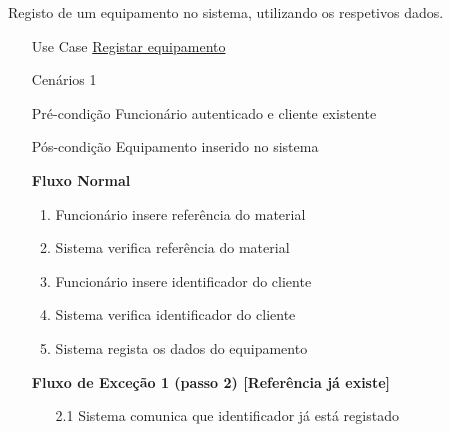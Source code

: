\documentclass[../relatorio.tex]{subfiles}
\begin{document}
Registo de um equipamento no sistema, utilizando os respetivos dados.
\begin{itemize}
    \item[Use Case] {\underline{Registar equipamento}}
    \item[Cenários] {1}
    \item[Pré-condição] {Funcionário autenticado e cliente existente}
    \item[Pós-condição] {Equipamento inserido no sistema}
          \begin{flushleft}
              \textbf{Fluxo Normal}
          \end{flushleft}
          \begin{enumerate}
              \item Funcionário insere referência do material
              \item Sistema verifica referência do material
              \item Funcionário insere identificador do cliente
              \item Sistema verifica identificador do cliente
              \item Sistema regista os dados do equipamento
          \end{enumerate}
          \begin{flushleft}
            \textbf{Fluxo de Exceção 1 (passo 2) [Referência já existe]}
        \end{flushleft}
        \begin{itemize}
            \item[2.1]{Sistema comunica que identificador já está registado}
        \end{itemize}
\end{itemize}
\end{document}
